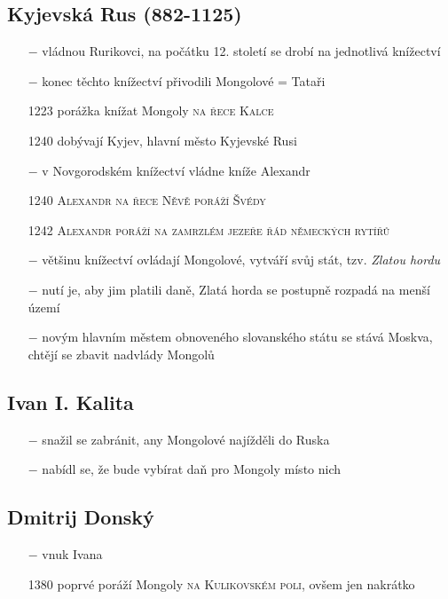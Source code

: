 \documentclass{article}
\begin{document}
  \subsection*{Kyjevská Rus (882-1125)}
  \begin{itemize}
      \vspace{-0.5em}
      \setlength\itemsep{0.15em}
      \item[$-$] vládnou Rurikovci, na počátku 12. století se drobí na jednotlivá knížectví
      \item[$-$] konec těchto knížectví přivodili Mongolové = Tataři
      \item[1223] porážka knížat Mongoly \textsc{na řece Kalce}
      \item[1240] dobývají Kyjev, hlavní město Kyjevské Rusi
      \item[$-$] v Novgorodském knížectví vládne kníže Alexandr
      \item[1240] \textsc{Alexandr na řece Něvě poráží Švédy}
      \item[1242]  \textsc{Alexandr poráží na zamrzlém jezeře řád německých rytířů}
      \item[$-$] většinu knížectví ovládají Mongolové, vytváří svůj stát, tzv. \textit{Zlatou hordu}
      \item[$-$] nutí je, aby jim platili daně, Zlatá horda se postupně rozpadá na menší území
      \item[$-$] novým hlavním městem obnoveného slovanského státu se stává Moskva, chtějí se zbavit nadvlády Mongolů
  \end{itemize}


  \subsection*{Ivan I. Kalita}
  \begin{itemize}
      \vspace{-0.5em}
      \setlength\itemsep{0.15em}
      \item[$-$] snažil se zabránit, any Mongolové najížděli do Ruska
      \item[$-$] nabídl se, že bude vybírat daň pro Mongoly místo nich
  \end{itemize}


  \subsection*{Dmitrij Donský}
  \begin{itemize}
      \vspace{-0.5em}
      \setlength\itemsep{0.15em}
      \item[$-$] vnuk Ivana
      \item[1380] poprvé poráží Mongoly \textsc{na Kulikovském poli}, ovšem jen nakrátko
  \end{itemize}
\end{document}
